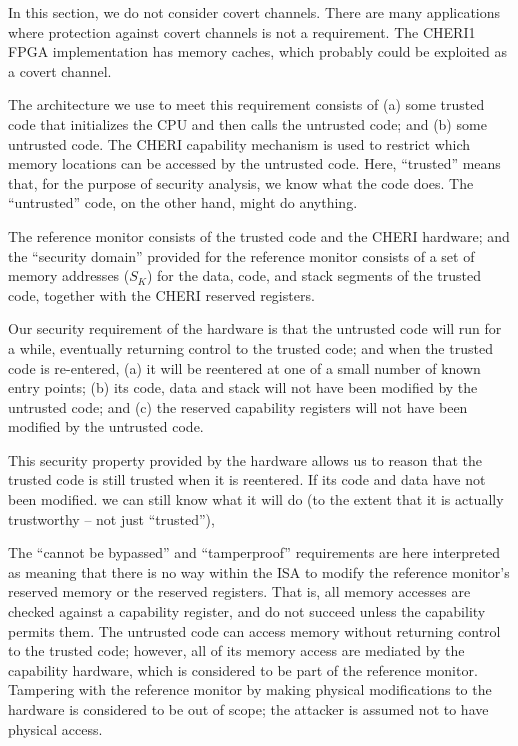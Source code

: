 In this section, we do not consider covert channels. There are many
applications where protection against covert channels is not a requirement.
The CHERI1 FPGA implementation has memory caches, which probably could be
exploited as a covert channel.

The architecture we use to meet this requirement consists of
(a) some trusted code that initializes the CPU and then calls the untrusted
 code; and (b) some untrusted code. The CHERI capability mechanism is
used to restrict which memory locations can be accessed by the untrusted
code.
Here, ``trusted'' means
that, for the purpose of security analysis, we know what the code does. The
``untrusted'' code, on the other hand, might do anything.

The reference monitor consists of the trusted code and the CHERI hardware; and
the ``security domain'' provided for the reference monitor consists of a set of
memory addresses ($S_K$) for the data, code, and stack segments of the trusted
code, together with the CHERI reserved registers.

Our security requirement of the hardware is that the untrusted code will run 
for a while, eventually returning control to the trusted code; and when the
trusted code is re-entered, (a) it will be reentered at one of a small number
of known entry points; (b) its code, data and stack will not have been modified
by the untrusted code; and (c) the reserved capability registers will not have
been modified by the untrusted code.

This security property provided by the hardware allows us to reason that the
trusted code is still trusted when it is reentered. If its code and data have
not been modified. we can still know what it will do
(to the extent that it is actually trustworthy -- not just ``trusted''),

The ``cannot be bypassed'' and ``tamperproof'' requirements  are here
interpreted as meaning that there is no way within the ISA to modify the
reference monitor's reserved memory or the reserved registers. That is, all
memory accesses are checked against a capability register, and do not succeed
unless the capability permits them. The untrusted code can access memory without
returning control to the trusted code; 
however, all of its memory access are mediated
by the capability hardware, which is considered to be part of the reference
monitor. Tampering with the reference monitor by making physical modifications
to the hardware is considered to be out of scope; the attacker is assumed
not to have physical access.


